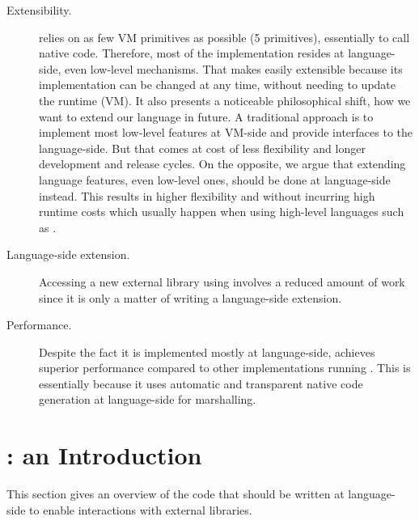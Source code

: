 \begin{description}
	\item[Extensibility.] \NBFFI relies on as few VM primitives as possible (5 primitives), essentially to call native code. 
	Therefore, most of the implementation resides at language-side, even low-level mechanisms.
	That makes \NBFFI easily extensible because its implementation can be changed at any time, without needing to update the runtime (VM).
	It also presents a noticeable philosophical shift, how we want to extend our language in future.
	A traditional approach is to implement most low-level features at VM-side and provide interfaces to the language-side.
	But that comes at cost of less flexibility and longer development and release cycles.
	On the opposite, we argue that extending language features, even low-level ones, should be done at language-side instead.
	This results in higher flexibility and without incurring high runtime costs which usually happen when using high-level languages such as \ST.
	\item[Language-side extension.] Accessing a new external library using \NBFFI involves a reduced amount of work since it is only a matter of writing a language-side extension.
	\item[Performance.] Despite the fact it is implemented mostly at language-side, \NBFFI achieves superior performance compared to other \FFI implementations running \PH.
    This is essentially because it uses automatic and transparent native code generation at language-side for marshalling.
\end{description}



\section{\NBFFI: an Introduction}

This section gives an overview of the code that should be written at language-side
to enable interactions with external libraries.


